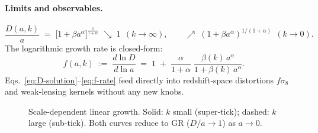 \documentclass[11pt]{article}
\begin{document}
\paragraph{Limits and observables.}
\begin{equation}
\frac{D(a,k)}{a}\;=\;\bigl[1+\beta a^{\alpha}\bigr]^{\frac{1}{1+\alpha}}
\;\searrow\;1\ \ (k\!\to\!\infty)\!,\qquad
\nearrow\;(1+\beta a^{\alpha})^{1/(1+\alpha)}\ \ (k\!\to\!0).
\end{equation}
The logarithmic growth rate is closed‑form:
\begin{equation}
\label{eq:f-rate}
f(a,k)\;:=\;\frac{d\ln D}{d\ln a}
\;=\;1\;+\;\frac{\alpha}{1+\alpha}\;\frac{\beta(k)\,a^{\alpha}}{1+\beta(k)\,a^{\alpha}}.
\end{equation}
Eqs.~\eqref{eq:D-solution}–\eqref{eq:f-rate} feed directly into redshift‑space distortions $f\sigma_{8}$ and weak‑lensing kernels without any new knobs.

\begin{figure}[t]
\centering
{}
\caption{Scale‑dependent linear growth. Solid: $k$ small (super‑tick); dashed: $k$ large (sub‑tick). Both curves reduce to GR ($D/a\!\to\!1$) as $a\!\to\!0$.}
\label{fig:ILG-growth}
\end{figure}
\end{document}
